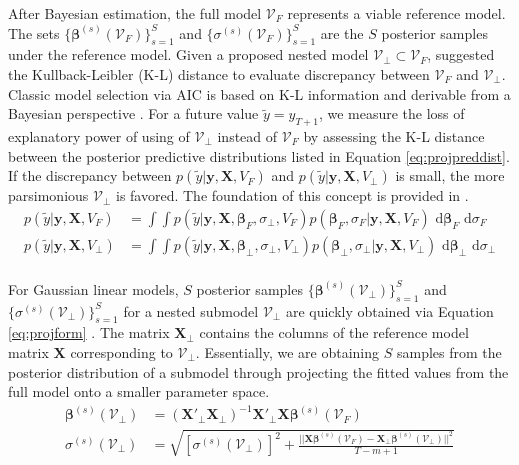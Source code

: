 After Bayesian estimation, the full model $\mathcal{V}_F$ represents a viable reference model. The sets $\{\bm{\beta}^{(s)}(\mathcal{V}_F)\}_{s=1}^S$ and $\{\sigma^{(s)}(\mathcal{V}_F)\}_{s=1}^S$ are the $S$ posterior samples under the reference model. Given a proposed nested model $\mathcal{V}_\perp \subset \mathcal{V}_F$, \cite{Goutis1998} suggested the Kullback-Leibler (K-L) distance \citep{Kullback1951} to evaluate discrepancy between $\mathcal{V}_F$ and $\mathcal{V}_\perp$. Classic model selection via AIC is based on K-L information and derivable from a Bayesian perspective \citep{Akaike1974,Akaike1985,burnham2003,Burnham2004}. For a future value $\tilde{y}=y_{T+1}$, we measure the loss of explanatory power of using of $\mathcal{V}_\perp$ instead of $\mathcal{V}_F$  by assessing the K-L distance between the posterior predictive distributions listed in Equation \ref{eq:projpreddist}. If the discrepancy between $p(\tilde{y}|\bm{y},\bm{X},V_F)$ and $p(\tilde{y}|\bm{y},\bm{X},V_\perp)$ is small, the more parsimonious $\mathcal{V}_\perp$ is favored.  The foundation of this concept is provided in \cite{Dupuis2003,Nott2010,vehtari2012,Piironen2015b,Piironen2017}.
\begin{equation}
\label{eq:projpreddist}
\begin{split}
p(\tilde{y}|\bm{y},\bm{X},V_F)&=\int\int p(\tilde{y}|\bm{y},\bm{X},\bm{\beta}_F,\sigma_\perp,V_F)p(\bm{\beta}_F,\sigma_F|\bm{y},\bm{X},V_F) \textrm{ d}\bm{\beta}_F \textrm{ d}\sigma_F\\
p(\tilde{y}|\bm{y},\bm{X},V_\perp)&=\int\int p(\tilde{y}|\bm{y},\bm{X},\bm{\beta}_\perp,\sigma_\perp,V_\perp)p(\bm{\beta}_\perp,\sigma_\perp|\bm{y},\bm{X},V_\perp) \textrm{ d}\bm{\beta}_\perp \textrm{ d}\sigma_\perp\\
\end{split}
\end{equation}


For Gaussian linear models, $S$ posterior samples $\{\bm{\beta}^{(s)}(\mathcal{V}_\perp)\}_{s=1}^S$ and $\{\sigma^{(s)}(\mathcal{V}_\perp)\}_{s=1}^S$ for a nested submodel $\mathcal{V}_\perp$ are quickly obtained via Equation \ref{eq:projform}  \citep{Piironen2015b}. The matrix $\bm{X}_\perp$ contains the columns of the reference model matrix $\bm{X}$ corresponding to $\mathcal{V}_\perp$. Essentially, we are obtaining $S$ samples from the posterior distribution of a submodel through projecting the fitted values from the full model  onto a smaller parameter space.
\begin{equation}
\label{eq:projform}
\begin{split}
	\bm{\beta}^{(s)}(\mathcal{V}_\perp) &= (\bm{X}'_\perp\bm{X}_\perp)^{-1}\bm{X}'_\perp\bm{X}\bm{\beta}^{(s)}(\mathcal{V}_F) \\
	\sigma^{(s)}(\mathcal{V}_\perp) &=\sqrt{[\sigma^{(s)}(\mathcal{V}_\perp)]^2+\frac{||\bm{X}\bm{\beta}^{(s)}(\mathcal{V}_F)-\bm{X}_\perp \bm{\beta}^{(s)}(\mathcal{V}_\perp)||^2}{T-m+1}}
\end{split}
\end{equation}

